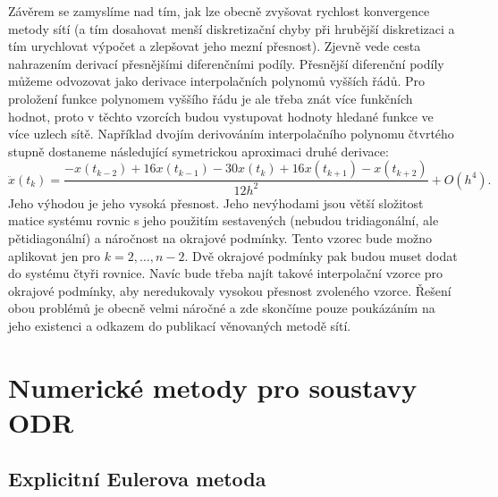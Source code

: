 \documentclass[a4paper, 12pt]{book}
\theoremstyle{definition}
\begin{document}
Závěrem se zamyslíme nad tím, jak lze obecně zvyšovat rychlost konvergence 
metody sítí (a tím dosahovat menší diskretizační chyby při hrubější diskretizaci 
a tím urychlovat výpočet a zlepšovat jeho mezní přesnost). Zjevně vede cesta 
nahrazením derivací přesnějšími diferenčními podíly. Přesnější diferenční podíly 
můžeme odvozovat jako derivace interpolačních polynomů vyšších řádů. Pro proložení 
funkce polynomem vyššího řádu je ale třeba znát více funkčních hodnot, proto 
v těchto vzorcích budou vystupovat hodnoty hledané funkce ve více uzlech sítě.
Například dvojím derivováním interpolačního polynomu čtvrtého stupně dostaneme 
následující symetrickou aproximaci druhé derivace:
\begin{displaymath}
\ddot x(t_k)=\frac{-x(t_{k-2})+16x(t_{k-1})-30x(t_k)+16x(t_{k+1})-x(t_{k+2})}{12h^2}+O(h^4).
\end{displaymath}
Jeho výhodou je jeho vysoká přesnost. Jeho nevýhodami jsou větší složitost 
matice systému rovnic s jeho použitím sestavených (nebudou tridiagonální, ale 
pětidiagonální) a náročnost na okrajové podmínky. Tento vzorec bude možno aplikovat 
jen pro $k=2,\dots,n-2$. Dvě okrajové podmínky pak budou muset dodat do systému
čtyři rovnice. Navíc bude třeba najít takové interpolační vzorce pro okrajové
podmínky, aby neredukovaly vysokou přesnost zvoleného vzorce. Řešení obou 
problémů je obecně velmi náročné a zde skončíme pouze poukázáním na jeho existenci
a odkazem do publikací věnovaných metodě sítí.










\chapter{Numerické metody pro soustavy ODR}

\section{Explicitní Eulerova metoda}
\end{document}
